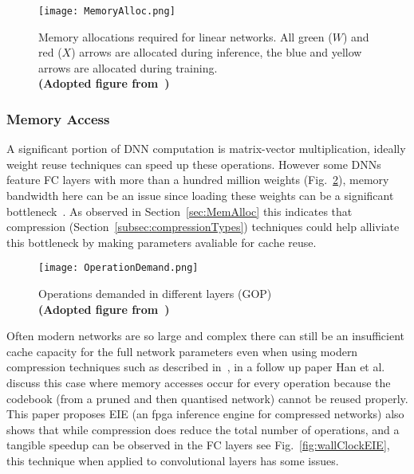 \documentclass[../../D1.tex]{subfiles}
\begin{document}
\begin{figure}[H]
    \texttt{[image: MemoryAlloc.png]} 
    \caption{Memory allocations required for linear networks. All green ($W$) and red ($X$) arrows are allocated during inference, the blue and yellow arrows are allocated during training.\\ \textbf{(Adopted figure from~\autocite{rhuVDNNVirtualizedDeep2016})}}
    \label{fig:memAllocInf}   
\end{figure}


\subsubsection{Memory Access}

A significant portion of DNN computation is matrix-vector multiplication, ideally weight reuse techniques can speed up these operations.
However some DNNs feature FC layers with more than a hundred million weights (Fig.~\ref{fig:CNNcomplexity}), memory bandwidth here can be an issue since loading these weights can be a significant bottleneck~\autocite{qiuGoingDeeperEmbedded2016}. 
As observed in Section~\ref{sec:MemAlloc} this indicates that compression (Section~\ref{subsec:compressionTypes}) techniques could help alliviate this bottleneck by making parameters avaliable for cache reuse.

\begin{figure}[H]
    \begin{center}
        \texttt{[image: OperationDemand.png]} 
    \end{center}
    
    \caption{Operations demanded in different layers (GOP)\\ \textbf{(Adopted figure from~\autocite{qiuGoingDeeperEmbedded2016})}}
    \label{fig:CNNcomplexity}   
\end{figure}

Often modern networks are so large and complex there can still be an insufficient cache capacity for the full network parameters even when using modern compression techniques such as described in~\autocite{hanDeepCompressionCompressing2016}, in a follow up paper Han et al.~\autocite{hanEIEEfficientInference2016} discuss this case where memory accesses occur for every operation because the codebook (from a pruned and then quantised network) cannot be reused properly.
This paper proposes EIE (an \acrshort{fpga} inference engine for compressed networks) also shows that while compression does reduce the total number of operations, and a tangible speedup can be observed in the FC layers see Fig.~\ref{fig:wallClockEIE}, this technique when applied to convolutional layers has some issues.
\end{document}
